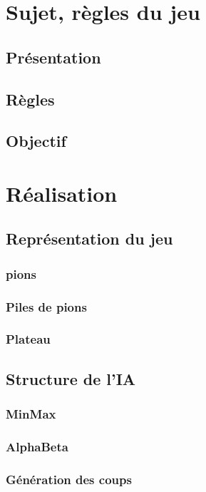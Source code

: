 \documentclass[article, backcover, french, nodocumentinfo]{upmethodology-document}
\begin{document}
	\upmdocumentsummary{}
	\upmdocumentauthors{}
	\upmdocumentinformedpeople{}
	\upmpublicationpage{}
	\thispagestyle{empty}
	\tableofcontents{}
	\lstlistoflistings{}
	\newpage{}

	\section{Sujet, règles du jeu}
		\subsection{Présentation}
		\subsection{Règles}
		\subsection{Objectif}
	\section{Réalisation}
		\subsection{Représentation du jeu}
			\subsubsection{pions}
			\subsubsection{Piles de pions}
			\subsubsection{Plateau}
		\subsection{Structure de l'IA}
			\subsubsection{MinMax}
			\subsubsection{AlphaBeta}
			\subsubsection{Génération des coups}
\end{document}
